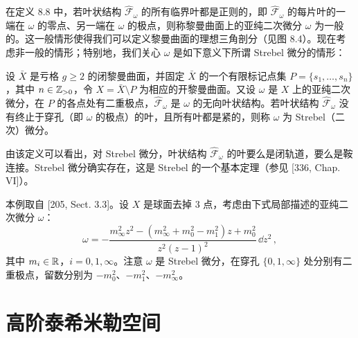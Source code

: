 在定义 8.8 中，若叶状结构 $\hat{\mathcal{F}}_\omega$ 的所有临界叶都是正则的，即 $\hat{\mathcal{F}}_\omega$ 的每片叶的一端在 $\omega$ 的零点、另一端在 $\omega$ 的极点，则称黎曼曲面上的亚纯二次微分 $\omega$ 为一般的。这一般情形使得我们可以定义黎曼曲面的理想三角剖分（见图 8.4）。现在考虑非一般的情形；特别地，我们关心 $\omega$ 是如下意义下所谓 Strebel 微分的情形：

\begin{definition}[8.14] 设 $\bar X$ 是亏格 $g\ge 2$ 的闭黎曼曲面，并固定 $\bar X$ 的一个有限标记点集 $P=\{s_1,\dots,s_n\}$，其中 $n\in\mathbb{Z}_{>0}$，令 $X=\bar X\setminus P$ 为相应的开黎曼曲面。又设 $\omega$ 是 $X$ 上的亚纯二次微分，在 $P$ 的各点处有二重极点，$\hat{\mathcal{F}}_\omega$ 是 $\omega$ 的无向叶状结构。若叶状结构 $\hat{\mathcal{F}}_\omega$ 没有终止于穿孔（即 $\omega$ 的极点）的叶，且所有叶都是紧的，则称 $\omega$ 为 Strebel（二次）微分。\end{definition}

由该定义可以看出，对 Strebel 微分，叶状结构 $\hat{\mathcal{F}}_\omega$ 的叶要么是闭轨道，要么是鞍连接。Strebel 微分确实存在，这是 Strebel 的一个基本定理（参见 [336, Chap. VI]）。


\begin{example}[8.15] 本例取自 [205, Sect. 3.3]。设 $X$ 是球面去掉 3 点，考虑由下式局部描述的亚纯二次微分 $\omega$：
\[
\omega=-\frac{m_\infty^2 z^2-(m_\infty^2+m_0^2-m_1^2)z+m_0^2}{z^2(z-1)^2}\,\dd z^2\,,
\]
其中 $m_i\in\mathbb{R}$，$i=0,1,\infty$。注意 $\omega$ 是 Strebel 微分，在穿孔 $\{0,1,\infty\}$ 处分别有二重极点，留数分别为 $-m_0^2$、$-m_1^2$、$-m_\infty^2$。\end{example}



\chapter{高阶泰希米勒空间}

